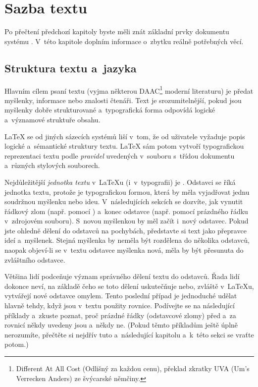 \chapter{Sazba textu}

\begin{intro}
  Po přečtení předchozí kapitoly byste měli znát základní prvky
  dokumentu systému \LaTeXe. V~této kapitole doplním
  informace o~zbytku reálně potřebných věcí.
\end{intro}

\section{Struktura textu a~jazyka}
Hlavním cílem psaní textu (vyjma některou
  DAAC\footnote{Different At All Cost (Odlišný za každou cenu),
  překlad zkratky UVA (Um's Verrecken Anders) ze švýcarské němčiny.}
  moderní literaturu)
  je předat myšlenky, informace nebo znalosti čtenáři. Text
  je srozumitelnější, pokud jsou myšlenky dobře strukturované
  a~typografická forma odpovídá logické a~významové struktuře
  obsahu.

\LaTeX{} se od jiných sázecích systémů liší v~tom, že od uživatele
vyžaduje popis logické a~sémantické struktury textu. \LaTeX{} sám potom
vytvoří typografickou reprezentaci textu podle \emph{pravidel}
uvedených v~souboru s~třídou dokumentu a~různých stylových souborech.

Nejdůležitější \emph{jednotka textu} v~\LaTeX u (i~v~typografii) je
. Odstavci se říká jednotka textu, protože 
je typografickou formou, která by měla vyjadřovat jednu
soudržnou myšlenku nebo ideu. V~následujících sekcích
se dozvíte, jak vynutit řádkový zlom (např. pomocí \texttt{\bs\bs})
a~konec odstavce (např. pomocí prázdného řádku v~zdrojovém souboru).
S~novou myšlenkou by měl začít i~nový odstavec. Pokud jste
ohledně dělení do odstavců na pochybách, představte si text
jako přepravce ideí a~myšlenek. Stejná myšlenka 
by neměla být rozdělena do několika odstavců, naopak objeví-li
se v~textu odstavce myšlenka nová, měla by být přesunuta
do zvláštního odstavce.

Většina lidí podceňuje význam správného dělení textu do odstavců.
Řada lidí dokonce neví, na základě čeho se toto dělení uskutečňuje
nebo, zvláště v~\LaTeX u, vytvářejí nové odstavce omylem. Tento
poslední případ je jednoduché udělat hlavně tehdy, když
jsou v~textu použity rovnice. Podívejte se na následující příklady
a~zkuste poznat, proč prázdné řádky (odstavcové zlomy) před a~za
rovnicí někdy uvedeny jsou a~někdy ne. (Pokud těmto příkladům ještě
úplně nerozumíte, přečtěte si nejdřív tuto a~následující kapitolu
a~k~této sekci se vraťte potom.)
  
